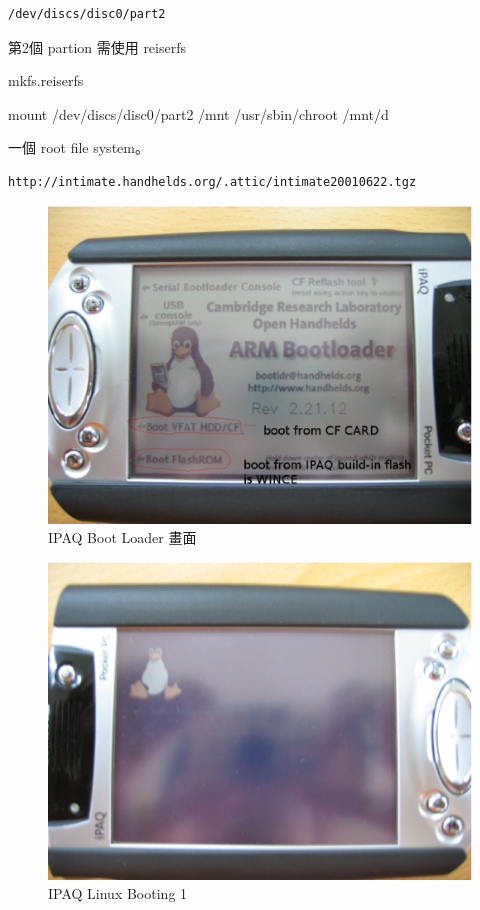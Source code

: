 \documentclass[12pt,a4paper]{article}
\begin{document}
\begin{CJK}{UTF8}{cwmu}
\begin{verbatim}
/dev/discs/disc0/part2
\end{verbatim}

第2個 partion 需使用 reiserfs

mkfs.reiserfs

mount /dev/discs/disc0/part2 /mnt
/usr/sbin/chroot /mnt/d

一個 root file system。
\begin{verbatim}
http://intimate.handhelds.org/.attic/intimate20010622.tgz 
\end{verbatim}


\begin{figure}[htbp]
\centering
\includegraphics[scale=0.5]{eps/bootloader.eps}
\caption{IPAQ Boot Loader 畫面}
\end{figure}

\begin{figure}[htbp]
\centering
\includegraphics[scale=0.5]{eps/booting_1.eps}
\caption{IPAQ Linux Booting 1}
\end{figure}


\end{CJK}
\end{document}
